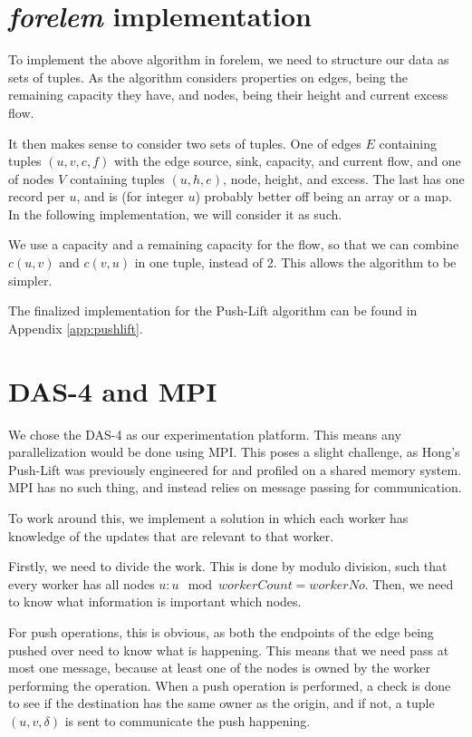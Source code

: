 \section{\textit{forelem} implementation}

To implement the above algorithm in forelem, we need to structure our data as sets of tuples. As the algorithm considers properties on edges, being the remaining capacity they have, and nodes, being their height and current excess flow.

It then makes sense to consider two sets of tuples. One of edges $E$ containing tuples $(u, v, c, f)$ with the edge source, sink, capacity, and current flow, and one of nodes $V$ containing tuples $(u, h, e)$, node, height, and excess. The last has one record per $u$, and is (for integer $u$) probably better off being an array or a map. In the following implementation, we will consider it as such.

We use a capacity and a remaining capacity for the flow, so that we can combine $c(u, v)$ and $c(v, u)$ in one tuple, instead of 2. This allows the algorithm to be simpler.

The finalized implementation for the Push-Lift algorithm can be found in Appendix \ref{app:pushlift}.

\section{DAS-4 and MPI}

We chose the DAS-4 as our experimentation platform. This means any parallelization would be done using MPI. This poses a slight challenge, as Hong's Push-Lift was previously engineered for and profiled on a shared memory system. MPI has no such thing, and instead relies on message passing for communication.

To work around this, we implement a solution in which each worker has knowledge of the updates that are relevant to that worker.

Firstly, we need to divide the work. This is done by modulo division, such that every worker has all nodes $u : u \mod	 workerCount = workerNo$. Then, we need to know what information is important which nodes.

For push operations, this is obvious, as both the endpoints of the edge being pushed over need to know what is happening. This means that we need pass at most one message, because at least one of the nodes is owned by the worker performing the operation. When a push operation is performed, a check is done to see if the destination has the same owner as the origin, and if not, a tuple $(u, v, \delta)$ is sent to communicate the push happening.

